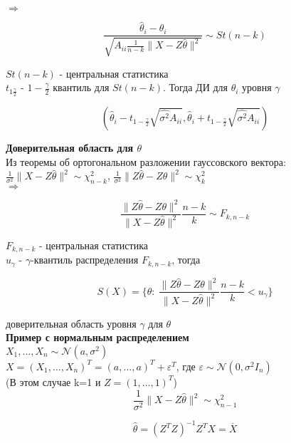 \documentclass{article}
\begin{document}
$\Rightarrow$

$$\frac{\widehat{\theta}_i - \theta_i}{\sqrt{A_{ii}\frac{1}{n-k}\|X - Z\widehat{\theta}\|^2}}\sim St(n-k)$$

$St(n-k)$ - центральная статистика\\

$t_{1\frac{\gamma}{2}}$ - $1-\frac{\gamma}{2}$ квантиль для $St(n-k)$. Тогда ДИ для $\theta_i$ уровня $\gamma$

$$ \left(\widehat{\theta}_i - t_{1-\frac{\gamma}{2}}\sqrt{\widehat{\sigma^2}A_{ii}}, \widehat{\theta}_i + t_{1-\frac{\gamma}{2}}\sqrt{\widehat{\sigma^2}A_{ii}}   \right)  $$

\textbf{Доверительная область для $\theta$}\\

Из теоремы об ортогональном разложении гауссовского вектора:\\

$\frac{1}{\sigma^2}\|X - Z\widehat{\theta}\|^2\sim\chi^2_{n-k}$, $\frac{1}{\sigma^2}\|Z\widehat{\theta} - Z\theta\|^2\sim\chi^2_k$\\

$\Rightarrow$

$$ \frac{\|Z\widehat{\theta} - Z\theta\|^2}{\|X-Z\widehat{\theta}\|^2}\frac{n-k}{k}\sim F_{k,n-k}$$

$F_{k, n-k}$ - центральная статистика\\

$u_\gamma$ - $\gamma$-квантиль распределения $F_{k, n-k}$, тогда

$$S(X) = \{\theta:\  \frac{\|Z\widehat{\theta} - Z\theta\|^2}{\|X-Z\widehat{\theta}\|^2}\frac{n-k}{k} < u_\gamma\}$$

доверительная область уровня $\gamma$ для $\theta$\\

\textbf{Пример с нормальным распределением}\\

$X_1,\dots,X_n\sim\mathcal{N}(a,\sigma^2)$\\

$X = (X_1,\dots,X_n)^T = (a,\dots,a)^T + \varepsilon^T$, где $\varepsilon\sim\mathcal{N}(0, \sigma^2I_n)$\\

(В этом случае k=1 и $Z = (1,\dots,1)^T$)\\

$$\frac{1}{\sigma^2}\|X - Z\widehat{\theta}\|^2\sim\chi^2_{n-1}$$

$$\widehat{\theta} = (Z^TZ)^{-1}Z^TX = \overline{X}$$
\end{document}
